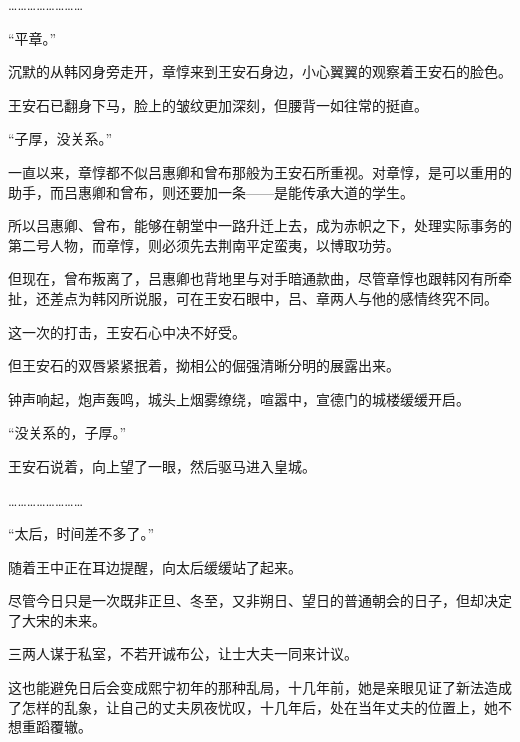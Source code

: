 ……………………

“平章。”

沉默的从韩冈身旁走开，章惇来到王安石身边，小心翼翼的观察着王安石的脸色。

王安石已翻身下马，脸上的皱纹更加深刻，但腰背一如往常的挺直。

“子厚，没关系。”

一直以来，章惇都不似吕惠卿和曾布那般为王安石所重视。对章惇，是可以重用的助手，而吕惠卿和曾布，则还要加一条——是能传承大道的学生。

所以吕惠卿、曾布，能够在朝堂中一路升迁上去，成为赤帜之下，处理实际事务的第二号人物，而章惇，则必须先去荆南平定蛮夷，以博取功劳。

但现在，曾布叛离了，吕惠卿也背地里与对手暗通款曲，尽管章惇也跟韩冈有所牵扯，还差点为韩冈所说服，可在王安石眼中，吕、章两人与他的感情终究不同。

这一次的打击，王安石心中决不好受。

但王安石的双唇紧紧抿着，拗相公的倔强清晰分明的展露出来。

钟声响起，炮声轰鸣，城头上烟雾缭绕，喧嚣中，宣德门的城楼缓缓开启。

“没关系的，子厚。”

王安石说着，向上望了一眼，然后驱马进入皇城。

……………………

“太后，时间差不多了。”

随着王中正在耳边提醒，向太后缓缓站了起来。

尽管今日只是一次既非正旦、冬至，又非朔日、望日的普通朝会的日子，但却决定了大宋的未来。

三两人谋于私室，不若开诚布公，让士大夫一同来计议。

这也能避免日后会变成熙宁初年的那种乱局，十几年前，她是亲眼见证了新法造成了怎样的乱象，让自己的丈夫夙夜忧叹，十几年后，处在当年丈夫的位置上，她不想重蹈覆辙。



